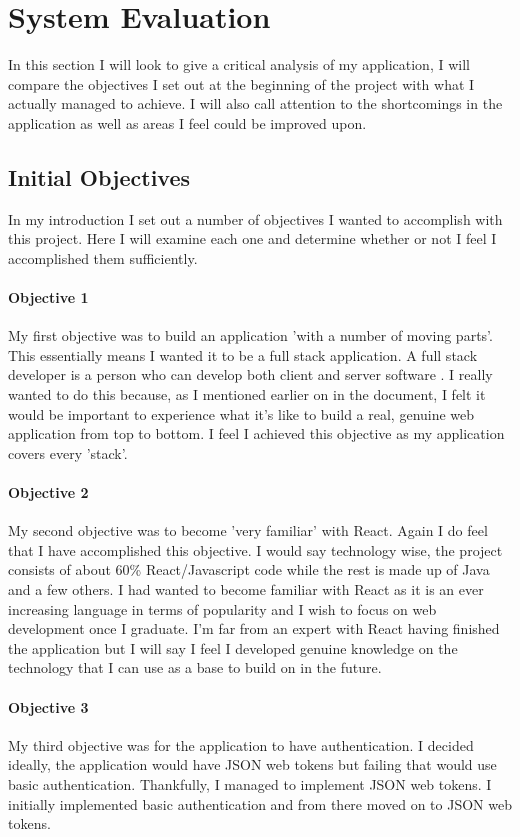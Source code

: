 \chapter{System Evaluation}
In this section I will look to give a critical analysis of my application, I will compare the objectives I set out at the beginning of the project with what I actually managed to achieve. I will also call attention to the shortcomings in the application as well as areas I feel could be improved upon.


\section{Initial Objectives}
In my introduction I set out a number of objectives I wanted to accomplish with this project. Here I will examine each one and determine whether or not I feel I accomplished them sufficiently.

\subsubsection{Objective 1}
My first objective was to build an application 'with a number of moving parts'. This essentially means I wanted it to be a full stack application. A full stack developer is a person who can develop both client and server software \cite{FullStack}. I really wanted to do this because, as I mentioned earlier on in the document, I felt it would be important to experience what it's like to build a real, genuine web application from top to bottom. I feel I achieved this objective as my application covers every 'stack'.

\subsubsection{Objective 2}
My second objective was to become 'very familiar' with React. Again I do feel that I have accomplished this objective. I would say technology wise, the project consists of about 60\% React/Javascript code while the rest is made up of Java and a few others. I had wanted to become familiar with React as it is an ever increasing language in terms of popularity and I wish to focus on web development once I graduate. I'm far from an expert with React having finished the application but I will say I feel I developed genuine knowledge on the technology that I can use as a base to build on in the future.

\subsubsection{Objective 3}
My third objective was for the application to have authentication. I decided ideally, the application would have JSON web tokens but failing that would use basic authentication. Thankfully, I managed to implement JSON web tokens. I initially implemented basic authentication and from there moved on to JSON web tokens.

